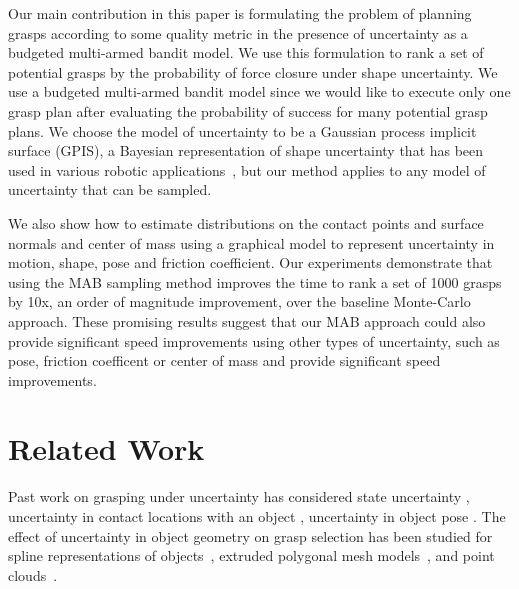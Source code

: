 \documentclass[journal,transmag]{IEEEtran}%
\begin{document}
Our main contribution in this paper is formulating the problem of planning grasps according to some quality metric in the presence of uncertainty as a budgeted multi-armed bandit model.
We use this formulation to rank a set of potential grasps by the probability of force closure \cite{christopoulos2007handling, kehoe2012toward} under shape uncertainty.
We use a budgeted multi-armed bandit model since we would like to execute only one grasp plan after evaluating the probability of success for many potential grasp plans.
We choose the model of uncertainty to be a Gaussian process implicit surface (GPIS), a Bayesian representation of shape uncertainty that has been used in various robotic applications~\cite{dragiev2011, hollinger2013}, but our method applies to any model of uncertainty that can be sampled.

We also show how to estimate distributions on the contact points and surface normals and center of mass using a graphical model to represent uncertainty in motion, shape, pose and friction coefficient. Our experiments demonstrate that using the MAB sampling method improves the time to rank a set of 1000 grasps by 10x, an order of magnitude improvement, over the baseline Monte-Carlo approach. These promising results suggest that our MAB approach could also provide  significant speed improvements using other types of uncertainty, such as pose, friction coefficent or center of mass and provide significant speed improvements. 

\section{Related Work}

Past work on grasping under uncertainty has considered state uncertainty \cite{goldberg1990bayesian, stulp2011learning}, uncertainty in contact locations with an object \cite{zheng2005}, uncertainty in object pose \cite{christopoulos2007handling, weisz2012pose, kim2012physically}.
The effect of uncertainty in object geometry on grasp selection has been studied for spline representations of objects~\cite{christopoulos2007handling}, extruded polygonal mesh models~\cite{kehoe2012estimating, kehoe2012toward}, and point clouds~\cite{hsiao2011bayesian}.
\end{document}

